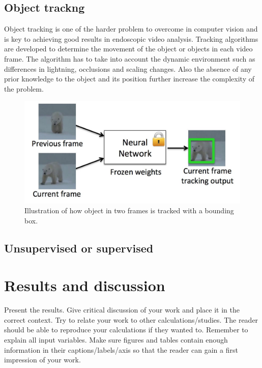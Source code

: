 \documentclass[english, a4paper]{report}
\begin{document}
\subsection{Object trackng}
Object tracking is one of the harder problem to overcome in computer vision and is key to achieving good results in endoscopic video analysis. Tracking algorithms are developed to determine the movement of the object or objects in each video frame. The algorithm has to take into account the dynamic environment such as differences in lightning, occlusions and scaling changes. Also the absence of any prior knowledge to the object and its position further increase the complexity of the problem.

\begin{figure}[H]
\begin{center}
 \includegraphics[width=\textwidth]{object-tracking.jpg}
 \caption{Illustration of how object in two frames is tracked with a bounding box. \cite{ImageGoturnInputsOuputs} }
 \label{fig:object-tracking}
 \end{center}
\end{figure}

 

\subsection{Unsupervised or supervised}





\section{Results and discussion}
Present the results. Give critical discussion of your work and place it in the correct context. Try to relate your work to other calculations/studies. The reader should be able to reproduce your calculations if they wanted to. Remember to explain all input variables. Make sure figures and tables contain enough information in their captions/labels/axis so that the reader can gain a first impression of your work.
\end{document}
